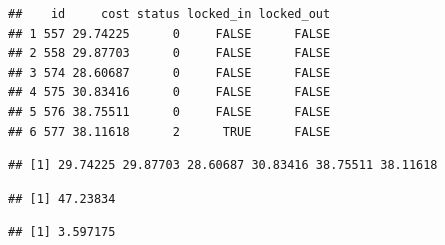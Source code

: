 \documentclass[
  12pt,
]{book}
\newenvironment{Shaded}{\begin{snugshade}}{\end{snugshade}}
\newcommand{\CommentTok}[1]{\textcolor[rgb]{0.56,0.35,0.01}{\textit{#1}}}
\newcommand{\KeywordTok}[1]{\textcolor[rgb]{0.13,0.29,0.53}{\textbf{#1}}}
\newcommand{\NormalTok}[1]{#1}
\newcommand{\OperatorTok}[1]{\textcolor[rgb]{0.81,0.36,0.00}{\textbf{#1}}}
\begin{document}
\begin{verbatim}
##    id     cost status locked_in locked_out
## 1 557 29.74225      0     FALSE      FALSE
## 2 558 29.87703      0     FALSE      FALSE
## 3 574 28.60687      0     FALSE      FALSE
## 4 575 30.83416      0     FALSE      FALSE
## 5 576 38.75511      0     FALSE      FALSE
## 6 577 38.11618      2      TRUE      FALSE
\end{verbatim}

\begin{Shaded}
\end{Shaded}

\begin{verbatim}
## [1] 29.74225 29.87703 28.60687 30.83416 38.75511 38.11618
\end{verbatim}

\begin{Shaded}
\end{Shaded}

\begin{verbatim}
## [1] 47.23834
\end{verbatim}

\begin{Shaded}
\end{Shaded}

\begin{verbatim}
## [1] 3.597175
\end{verbatim}

\begin{Shaded}
\end{Shaded}
\end{document}
